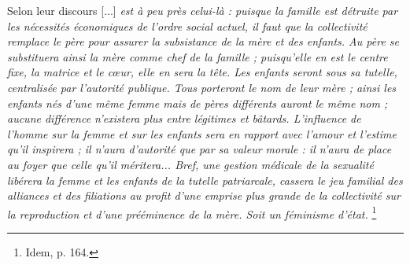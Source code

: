  Selon  leur discours {[...] \emph{est à peu près celui-là : puisque la famille est détruite par les nécessités économiques de l'ordre social actuel, il faut que la collectivité remplace le père pour assurer la subsistance de la mère et des enfants. Au père se substituera ainsi la mère comme chef de la famille ; puisqu'elle en est le centre fixe, la matrice et le cœur, elle en sera la tête. Les enfants seront sous sa tutelle, centralisée par l'autorité publique. Tous porteront le nom de leur mère ; ainsi les enfants nés d'une même femme mais de pères différents auront le même nom ; aucune différence n'existera plus entre légitimes et bâtards. L'influence de l'homme sur la femme et sur les enfants sera en rapport avec l'amour et l'estime qu'il inspirera ; il n'aura d'autorité que par sa valeur morale : il n'aura de place au foyer que celle qu'il méritera... Bref, une gestion médicale de la sexualité libérera la femme et les enfants de la tutelle patriarcale, cassera le jeu familial des alliances et des filiations au profit d'une emprise plus grande de la collectivité sur la reproduction et d'une prééminence de la mère. Soit un féminisme d'état.}%
\footnote{Idem, p. 164.}%
}

